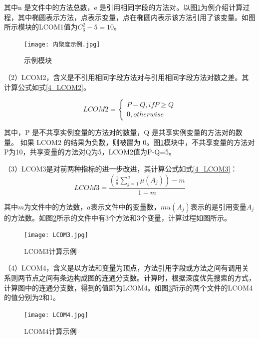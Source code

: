 其中n 是文件中的方法总数，e 是引用相同字段的方法对。以图\ref{4_示例模块}为例介绍计算过程，其中椭圆表示方法，点表示变量，点在椭圆内表示该方法引用了该变量。如图所示模块的LCOM1值为\(C_{6}^{2} - 5 = 10\)。

\begin{figure}[h]
\centering
\texttt{[image: 内聚度示例.jpg]}
\caption{示例模块}
\label{4_示例模块}
\end{figure}
    

（2）LCOM2，含义是不引用相同字段方法对与引用相同字段方法对数之差\cite{1996Coupling}。其计算公式如式\ref{4_LCOM2}。

\begin{equation}
\label{4_LCOM2}
    {LCOM2}=\left\{
        \begin{array}
        {c}P-Q,  ifP\geq Q \\
        0,  otherwise
        \end{array}\right.
\end{equation}

其中，P 是不共享实例变量的方法对的数量，Q 是共享实例变量的方法对的数量。
如果 LCOM2 的结果为负数，则被置为 0。图\ref{4_示例模块}模块中，不共享变量的方法对P为10，共享变量的方法对Q为5，LCOM2值为P-Q=5。

（3）LCOM3是对前两种指标的进一步改进，其计算公式如式\ref{4_LCOM3}：
\begin{equation}
\label{4_LCOM3}
LCOM3 = \frac{\left( \frac{1}{a} \sum_{j=1}^a \mu(A_j) \right) - m}{1 - m}
\end{equation}

其中\( m\)为文件中的方法数，\( a\)表示文件中的变量数，\( mu(A_j)\)表示的是引用变量\(A_j\)的方法数。如图\ref{4_LCOM3计算示例}所示的文件中有3个方法和3个变量，计算过程如图所示。
\begin{figure}[h]
\centering
\texttt{[image: LCOM3.jpg]}
\caption{LCOM3计算示例}
\label{4_LCOM3计算示例}
\end{figure}



（4）LCOM4，含义是以方法和变量为顶点，方法引用字段或方法之间有调用关系则两节点之间有条边构成图的连通分支数\cite{1995Measuring}。计算时，根据深度优先搜索的方式，计算图中的连通分支数，得到的值即为LCOM4。如图\ref{4_LCOM4计算示例}所示的两个文件的LCOM4的值分别为2和1。

\begin{figure}[h]
\centering
\texttt{[image: LCOM4.jpg]}
\caption{LCOM4计算示例}
\label{4_LCOM4计算示例}
\end{figure}

